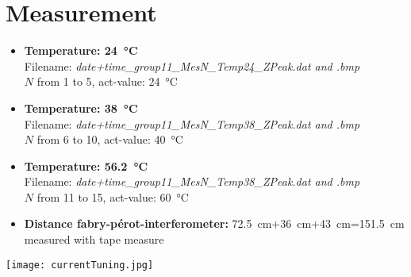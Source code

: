 \section*{Measurement}
\begin{itemize}
    \item \textbf{Temperature: \SI{24}{\celsius}} \\ 
    Filename: \textit{date+time\_group11\_MesN\_Temp24\_ZPeak.dat and .bmp}\\ $N$ from 1 to 5, act-value: \SI{24}{\celsius}
    \item \textbf{Temperature: \SI{38}{\celsius}} \\ 
    Filename: \textit{date+time\_group11\_MesN\_Temp38\_ZPeak.dat and .bmp}\\ $N$ from 6 to 10, act-value: \SI{40}{\celsius}
    \item \textbf{Temperature: \SI{56,2}{\celsius}} \\ 
    Filename: \textit{date+time\_group11\_MesN\_Temp38\_ZPeak.dat and .bmp}\\ $N$ from 11 to 15, act-value: \SI{60}{\celsius}
    \item \textbf{Distance fabry-pérot-interferometer:} \SI{72,5}{\centi\metre}+\SI{36}{\centi\metre}+\SI{43}{\centi\metre}=\SI{151,5}{\centi\metre}\\ measured with tape measure
\end{itemize}

\begin{center}
    \texttt{[image: currentTuning.jpg]}
\end{center}